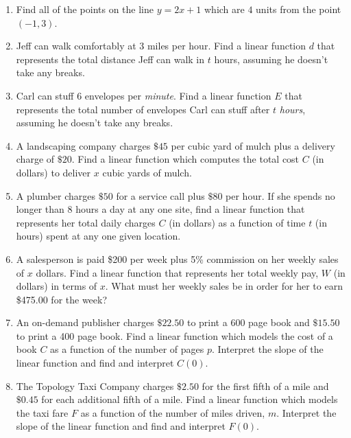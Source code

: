 \begin{enumerate}
\setcounter{enumi}{\value{HW}}

\item  Find all of the points on the line $y=2x+1$ which are $4$ units from the point $(-1,3)$.


\item  Jeff can walk comfortably at $3$ miles per hour.  Find a linear function $d$ that represents the total distance Jeff can walk in $t$ hours, assuming he doesn't take any breaks.

\item  Carl can stuff $6$ envelopes per \textit{minute}.  Find a linear function $E$ that represents the total number of envelopes Carl can stuff after $t$ \textit{hours}, assuming he doesn't take any breaks.

\item  A landscaping company charges $\$45$ per cubic yard of mulch plus a delivery charge of $\$20$.  Find a linear function which computes the total cost $C$ (in dollars) to deliver $x$ cubic yards of mulch.

\item  A plumber charges $\$50$ for a service call plus $\$80$ per hour.  If she spends no longer than 8 hours a day at any one site, find a linear function that represents her total daily charges $C$ (in dollars) as a function of time $t$ (in hours) spent at any one given location.

\item A salesperson is paid \$200 per week plus 5\% commission on her weekly sales of $x$ dollars.  Find a linear function that represents her total weekly pay, $W$ (in dollars) in terms of $x$.  What must her weekly sales be in order for her to earn \$475.00 for the week?


\item  An on-demand publisher charges $\$22.50$ to print a 600 page book and $\$15.50$ to print a 400 page book.  Find a linear function which models the cost of a book $C$ as a function of the number of pages $p$.  Interpret the slope of the linear function and find and interpret $C(0)$.

\item The Topology Taxi Company charges $\$2.50$ for the first fifth of a mile and $\$0.45$ for each additional fifth of a mile.  Find a linear function which models the taxi fare $F$ as a function of the number of miles driven, $m$.  Interpret the slope of the linear function and find and interpret $F(0)$.


\end{enumerate}

